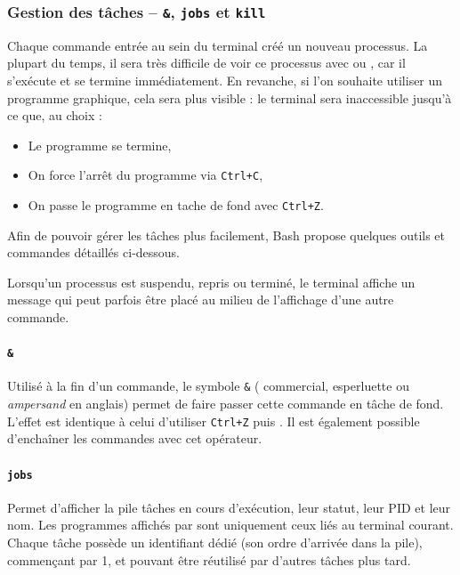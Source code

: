 \newpage
\subsubsection{Gestion des tâches -- \texttt{\&}, \texttt{jobs} et \texttt{kill}} \label{sec:tasks}

Chaque commande entrée au sein du terminal créé un nouveau processus. La plupart du temps, il sera très difficile de voir ce processus avec  ou , car il s'exécute et se termine immédiatement. En revanche, si l'on souhaite utiliser un programme graphique, cela sera plus visible : le terminal sera inaccessible jusqu'à ce que, au choix : 
\begin{itemize}
    \item Le programme se termine,
    \item On force l'arrêt du programme via \texttt{Ctrl+C},
    \item On passe le programme en tache de fond avec \texttt{Ctrl+Z}.
\end{itemize}

Afin de pouvoir gérer les tâches plus facilement, Bash propose quelques outils et commandes détaillés ci-dessous.

 Lorsqu'un processus est suspendu, repris ou terminé, le terminal affiche un message qui peut parfois être placé au milieu de l'affichage d'une autre commande.

\paragraph{\texttt{\&}} 
Utilisé à la fin d'un commande, le symbole \texttt{\&} ( commercial, esperluette ou \textit{ampersand} en anglais) permet de faire passer cette commande en tâche de fond. L'effet est identique à celui d'utiliser \texttt{Ctrl+Z} puis . Il est également possible d'enchaîner les commandes avec cet opérateur.


\paragraph{\texttt{jobs}} 
Permet d'afficher la pile tâches en cours d'exécution,  leur statut, leur PID et leur nom. Les programmes affichés par  sont uniquement ceux liés au terminal courant. Chaque tâche possède un identifiant dédié (son ordre d'arrivée dans la pile), commençant par 1, et pouvant être réutilisé par d'autres tâches plus tard.

